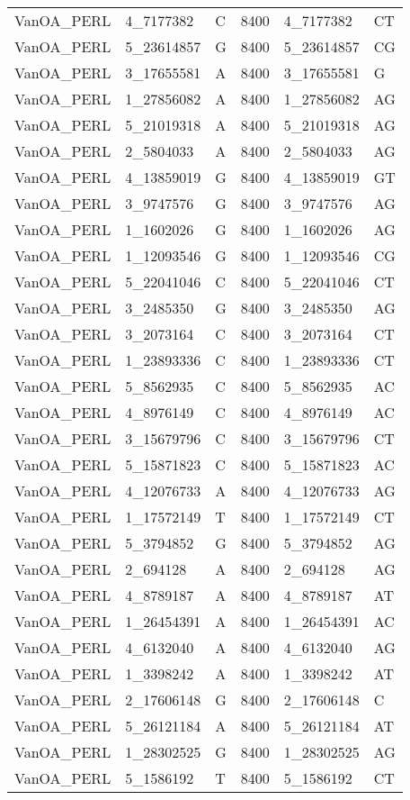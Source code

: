 \begin{center}
\begin{longtable}{|l|l|l|l|l|l|}
VanOA\_PERL&4\_7177382&C&8400&4\_7177382&CT\\
VanOA\_PERL&5\_23614857&G&8400&5\_23614857&CG\\
VanOA\_PERL&3\_17655581&A&8400&3\_17655581&G\\
VanOA\_PERL&1\_27856082&A&8400&1\_27856082&AG\\
VanOA\_PERL&5\_21019318&A&8400&5\_21019318&AG\\
VanOA\_PERL&2\_5804033&A&8400&2\_5804033&AG\\
VanOA\_PERL&4\_13859019&G&8400&4\_13859019&GT\\
VanOA\_PERL&3\_9747576&G&8400&3\_9747576&AG\\
VanOA\_PERL&1\_1602026&G&8400&1\_1602026&AG\\
VanOA\_PERL&1\_12093546&G&8400&1\_12093546&CG\\
VanOA\_PERL&5\_22041046&C&8400&5\_22041046&CT\\
VanOA\_PERL&3\_2485350&G&8400&3\_2485350&AG\\
VanOA\_PERL&3\_2073164&C&8400&3\_2073164&CT\\
VanOA\_PERL&1\_23893336&C&8400&1\_23893336&CT\\
VanOA\_PERL&5\_8562935&C&8400&5\_8562935&AC\\
VanOA\_PERL&4\_8976149&C&8400&4\_8976149&AC\\
VanOA\_PERL&3\_15679796&C&8400&3\_15679796&CT\\
VanOA\_PERL&5\_15871823&C&8400&5\_15871823&AC\\
VanOA\_PERL&4\_12076733&A&8400&4\_12076733&AG\\
VanOA\_PERL&1\_17572149&T&8400&1\_17572149&CT\\
VanOA\_PERL&5\_3794852&G&8400&5\_3794852&AG\\
VanOA\_PERL&2\_694128&A&8400&2\_694128&AG\\
VanOA\_PERL&4\_8789187&A&8400&4\_8789187&AT\\
VanOA\_PERL&1\_26454391&A&8400&1\_26454391&AC\\
VanOA\_PERL&4\_6132040&A&8400&4\_6132040&AG\\
VanOA\_PERL&1\_3398242&A&8400&1\_3398242&AT\\
VanOA\_PERL&2\_17606148&G&8400&2\_17606148&C\\
VanOA\_PERL&5\_26121184&A&8400&5\_26121184&AT\\
VanOA\_PERL&1\_28302525&G&8400&1\_28302525&AG\\
VanOA\_PERL&5\_1586192&T&8400&5\_1586192&CT\\

\end{longtable}
\end{center}
